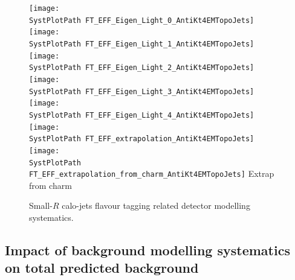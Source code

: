 \begin{figure}[!h]
\begin{center}
\texttt{[image: \\SystPlotPath FT\_EFF\_Eigen\_Light\_0\_AntiKt4EMTopoJets]} 
\texttt{[image: \\SystPlotPath FT\_EFF\_Eigen\_Light\_1\_AntiKt4EMTopoJets]} 
\texttt{[image: \\SystPlotPath FT\_EFF\_Eigen\_Light\_2\_AntiKt4EMTopoJets]} \\
\texttt{[image: \\SystPlotPath FT\_EFF\_Eigen\_Light\_3\_AntiKt4EMTopoJets]}
\texttt{[image: \\SystPlotPath FT\_EFF\_Eigen\_Light\_4\_AntiKt4EMTopoJets]}
\texttt{[image: \\SystPlotPath FT\_EFF\_extrapolation\_AntiKt4EMTopoJets]} \\
\texttt{[image: \\SystPlotPath FT\_EFF\_extrapolation\_from\_charm\_AntiKt4EMTopoJets]} {}{Extrap from charm}
\caption{Small-$R$ calo-jets flavour tagging related detector modelling systematics.}
\label{fig:systplots_btag_calojet_2}
\end{center}
\end{figure}


\FloatBarrier

\subsection{Impact of background modelling systematics on total predicted background}
\label{app:boosted_syst_bkgdmodel}

